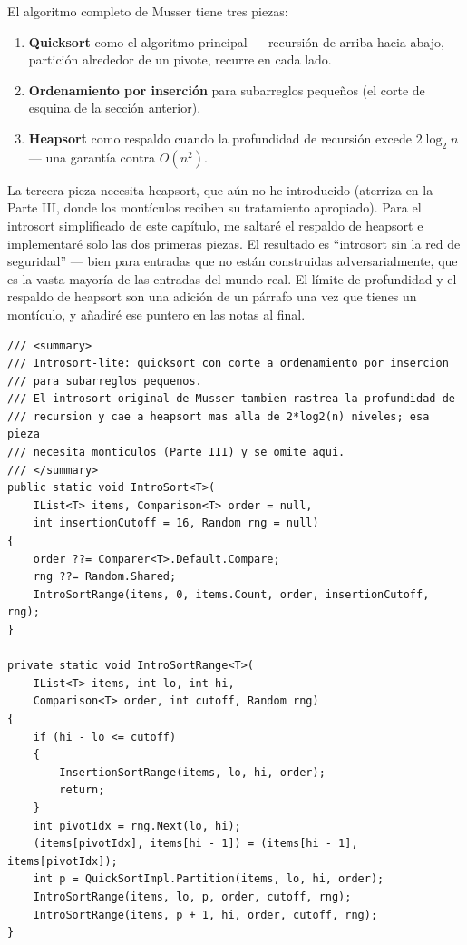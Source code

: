 \documentclass[11pt,a4paper]{article}
\begin{document}
El algoritmo completo de Musser tiene tres piezas:

\begin{enumerate}
\item \textbf{Quicksort} como el algoritmo principal --- recursión de arriba hacia abajo, partición alrededor de un pivote, recurre en cada lado.
\item \textbf{Ordenamiento por inserción} para subarreglos pequeños (el corte de esquina de la sección anterior).
\item \textbf{Heapsort} como respaldo cuando la profundidad de recursión excede $2 \log_2 n$ --- una garantía contra $O(n^2)$.
\end{enumerate}

La tercera pieza necesita heapsort, que aún no he introducido (aterriza en la Parte III, donde los montículos reciben su tratamiento apropiado). Para el introsort simplificado de este capítulo, me saltaré el respaldo de heapsort e implementaré solo las dos primeras piezas. El resultado es ``introsort sin la red de seguridad'' --- bien para entradas que no están construidas adversarialmente, que es la vasta mayoría de las entradas del mundo real. El límite de profundidad y el respaldo de heapsort son una adición de un párrafo una vez que tienes un montículo, y añadiré ese puntero en las notas al final.

\begin{lstlisting}[caption={Introsort-lite}]
/// <summary>
/// Introsort-lite: quicksort con corte a ordenamiento por insercion
/// para subarreglos pequenos.
/// El introsort original de Musser tambien rastrea la profundidad de
/// recursion y cae a heapsort mas alla de 2*log2(n) niveles; esa pieza
/// necesita monticulos (Parte III) y se omite aqui.
/// </summary>
public static void IntroSort<T>(
    IList<T> items, Comparison<T> order = null,
    int insertionCutoff = 16, Random rng = null)
{
    order ??= Comparer<T>.Default.Compare;
    rng ??= Random.Shared;
    IntroSortRange(items, 0, items.Count, order, insertionCutoff, rng);
}

private static void IntroSortRange<T>(
    IList<T> items, int lo, int hi,
    Comparison<T> order, int cutoff, Random rng)
{
    if (hi - lo <= cutoff)
    {
        InsertionSortRange(items, lo, hi, order);
        return;
    }
    int pivotIdx = rng.Next(lo, hi);
    (items[pivotIdx], items[hi - 1]) = (items[hi - 1], items[pivotIdx]);
    int p = QuickSortImpl.Partition(items, lo, hi, order);
    IntroSortRange(items, lo, p, order, cutoff, rng);
    IntroSortRange(items, p + 1, hi, order, cutoff, rng);
}
\end{lstlisting}
\end{document}

